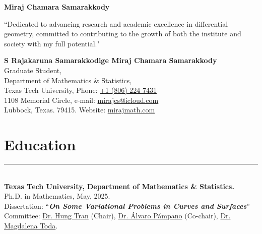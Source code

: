 \documentclass[12pt]{book}
\begin{document}
\pagestyle{fancy}
\thispagestyle{empty}
\begin{center}
\textbf{\Huge{Miraj Chamara Samarakkody}}\\
\end{center}

``Dedicated to advancing research and academic excellence in differential geometry, committed to contributing to the growth of both the institute and society with my full potential."\\
\vspace{0.05in}

\noindent \textbf{S Rajakaruna Samarakkodige Miraj Chamara Samarakkody}\\
Graduate Student,  \\
Department of Mathematics \& Statistics,    \\
Texas Tech University, \hfill Phone: \href{tel:+18062247431}{+1 (806) 224 7431}\\
1108 Memorial Circle,  \hfill e-mail: \href{mailto:mirajcs@icloud.com}{mirajcs@icloud.com}\\
Lubbock, Texas. 79415.  \hfill Website: \href{https://mirajmath.com}{mirajmath.com}\\



\section*{Education} \rule{\textwidth}{1pt}\\

\noindent \textbf{Texas Tech University, Department of Mathematics \& Statistics.}\\
Ph.D. in Mathematics, May, 2025. \\
Dissertation: ``\textit{\textbf{On Some Variational Problems in Curves and Surfaces}}''\\
Committee:  \href{https://www.myweb.ttu.edu/tra97432/}{Dr. Hung Tran} (Chair), \href{https://www.math.ttu.edu/~apampano/}{Dr. \'Alvaro P\'ampano} (Co-chair), \href{https://www.math.ttu.edu/~mtoda/}{Dr. Magdalena Toda}.\\
\end{document}
